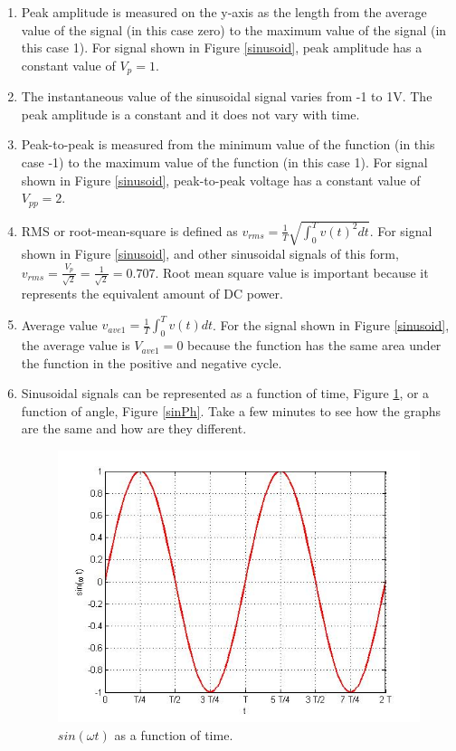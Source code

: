 \documentclass{ximera}
\begin{document}
\begin{enumerate}
\item Peak amplitude is measured on the y-axis as the length from the average value of the signal (in this case zero) to the maximum value of the signal (in this case 1). For signal shown in Figure \ref{sinusoid}, peak  amplitude has a constant value of $V_p=1$. 
\item The instantaneous value of the sinusoidal signal varies from -1 to 1V. The peak amplitude is a constant and it does not vary with time. 
\item Peak-to-peak is measured from the minimum value of the function (in this case -1) to the maximum value of the function (in this case 1).  For signal shown in Figure \ref{sinusoid}, peak-to-peak voltage has a constant value of  $V_{pp}=2$.
\item RMS or root-mean-square is defined as $v_{rms}=\frac{1}{T} \sqrt{\int_0^T v(t)^2 dt}$. For signal shown in Figure \ref{sinusoid}, and other sinusoidal signals of this form,  $v_{rms}=\frac{V_p}{\sqrt{2}}=\frac{1}{\sqrt{2}}=0.707$. Root mean square value is important because it represents the equivalent amount of DC power.  
\item Average value $v_{ave1}=\frac{1}{T} \int_0^T v(t) dt$. For the signal shown in Figure \ref{sinusoid}, the average value is $V_{ave1}=0$ because the function has the same area under the function in the positive and negative cycle. 
\item Sinusoidal signals can be represented as a function of time, Figure \ref{sin}, or a function of angle, Figure \ref{sinPh}. Take a few minutes to see how the graphs are the same and how are they different.



\begin{figure}[htpb]
\includegraphics[scale=0.4]{jpg/cpef1.jpg}
\caption{$sin ( \omega t)$ as a function of time.} \label{sin}
\end{figure}





\end{enumerate}
\end{document}
